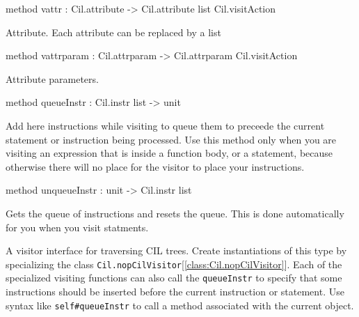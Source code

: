 \documentclass[11pt]{article}
\begin{document}
\begin{ocamldocobjectend}
\begin{ocamldocdescription}
\end{ocamldocdescription}


\label{method:Cil.cilVisitor.vattr}\begin{ocamldoccode}
method vattr : Cil.attribute -> Cil.attribute list Cil.visitAction
\end{ocamldoccode}
\begin{ocamldocdescription}
Attribute. Each attribute can be replaced by a list


\end{ocamldocdescription}


\label{method:Cil.cilVisitor.vattrparam}\begin{ocamldoccode}
method vattrparam : Cil.attrparam -> Cil.attrparam Cil.visitAction
\end{ocamldoccode}
\begin{ocamldocdescription}
Attribute parameters.


\end{ocamldocdescription}


\label{method:Cil.cilVisitor.queueInstr}\begin{ocamldoccode}
method queueInstr : Cil.instr list -> unit
\end{ocamldoccode}
\begin{ocamldocdescription}
Add here instructions while visiting to queue them to preceede the 
 current statement or instruction being processed. Use this method only 
 when you are visiting an expression that is inside a function body, or 
 a statement, because otherwise there will no place for the visitor to 
 place your instructions.


\end{ocamldocdescription}


\label{method:Cil.cilVisitor.unqueueInstr}\begin{ocamldoccode}
method unqueueInstr : unit -> Cil.instr list
\end{ocamldoccode}
\begin{ocamldocdescription}
Gets the queue of instructions and resets the queue. This is done 
 automatically for you when you visit statments.


\end{ocamldocdescription}
\end{ocamldocobjectend}


\begin{ocamldocdescription}
A visitor interface for traversing CIL trees. Create instantiations of 
 this type by specializing the class {\tt{Cil.nopCilVisitor}}[\ref{class:Cil.nopCilVisitor}]. Each of the 
 specialized visiting functions can also call the {\tt{queueInstr}} to specify 
 that some instructions should be inserted before the current instruction 
 or statement. Use syntax like {\tt{self\verb`#`queueInstr}} to call a method
 associated with the current object.


\end{ocamldocdescription}
\end{document}

